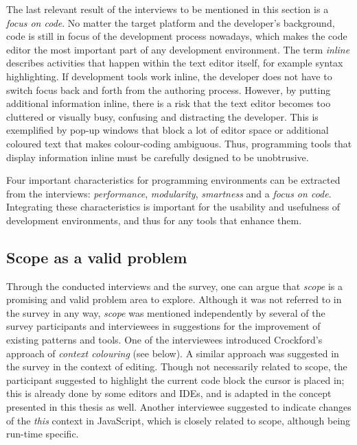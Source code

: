 The last relevant result of the interviews to be mentioned in this
section is a \emph{focus on code}. No matter the target platform and the
developer’s background, code is still in focus of the development
process nowadays, which makes the code editor the most important part of
any development environment. The term \emph{inline} describes activities
that happen within the text editor itself, for example syntax
highlighting. If development tools work inline, the developer does not
have to switch focus back and forth from the authoring process. However,
by putting additional information inline, there is a risk that the text
editor becomes too cluttered or visually busy, confusing and distracting
the developer. This is exemplified by pop-up windows that block a lot of
editor space or additional coloured text that makes colour-coding
ambiguous. Thus, programming tools that display information inline must
be carefully designed to be unobtrusive.

Four important characteristics for programming environments can be
extracted from the interviews: \emph{performance}, \emph{modularity},
\emph{smartness} and a \emph{focus on code}. Integrating these
characteristics is important for the usability and usefulness of
development environments, and thus for any tools that enhance them.

\subsection{Scope as a valid problem}\label{scope-as-a-valid-problem}

Through the conducted interviews and the survey, one can argue that
\emph{scope} is a promising and valid problem area to explore. Although
it was not referred to in the survey in any way, \emph{scope} was
mentioned independently by several of the survey participants and
interviewees in suggestions for the improvement of existing patterns and
tools. One of the interviewees introduced Crockford’s
\citeyear{crockford} approach of \emph{context colouring} (see below). A
similar approach was suggested in the survey in the context of editing.
Though not necessarily related to scope, the participant suggested to
highlight the current code block the cursor is placed in; this is
already done by some editors and IDEs, and is adapted in the concept
presented in this thesis as well. Another interviewee suggested to
indicate changes of the \emph{this} context in JavaScript, which is
closely related to scope, although being run-time specific.

